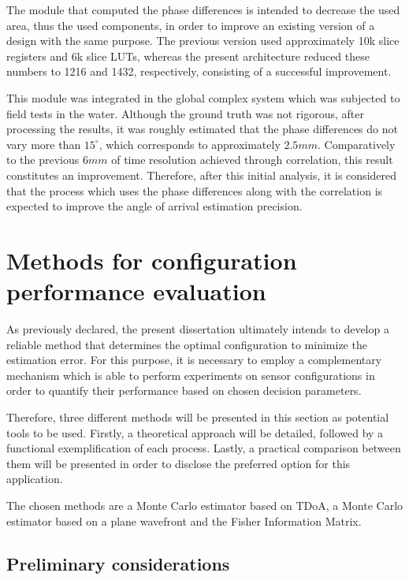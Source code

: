 The module that computed the phase differences is intended to decrease the used area, thus the used components, in order to improve an existing version of a design with the same purpose. The previous version used approximately 10k slice registers and 6k slice LUTs, whereas the present architecture reduced these numbers to 1216 and 1432, respectively, consisting of a successful improvement.

This module was integrated in the global complex system which was subjected to field tests in the water. Although the ground truth was not rigorous, after processing the results, it was roughly estimated that the phase differences do not vary more than $15^{\circ}$, which corresponds to approximately $2.5mm$. Comparatively to the previous $6mm$ of time resolution achieved through correlation, this result constitutes an improvement. Therefore, after this initial analysis, it is considered that the process which uses the phase differences along with the correlation is expected to improve the angle of arrival estimation precision.

\section{Methods for configuration performance evaluation} \label{subsec:AoA}

As previously declared, the present dissertation ultimately intends to develop a reliable method that determines the optimal configuration to minimize the estimation error. For this purpose, it is necessary to employ a complementary mechanism which is able to perform experiments on sensor configurations in order to quantify their performance based on chosen decision parameters.

Therefore, three different methods will be presented in this section as potential tools to be used. Firstly, a theoretical approach will be detailed, followed by a functional exemplification of each process. Lastly, a practical comparison between them will be presented in order to disclose the preferred option for this application.

The chosen methods are a Monte Carlo estimator based on TDoA, a Monte Carlo estimator based on a plane wavefront and the Fisher Information Matrix.

\subsection{Preliminary considerations}

